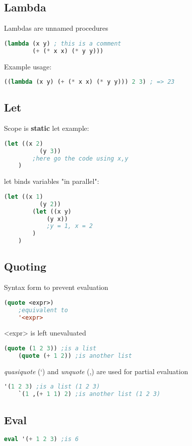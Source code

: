 

\subsection{Lambda}
Lambdas are unnamed procedures
\begin{lstlisting}[language=Lisp]
    (lambda (x y) ; this is a comment
        (+ (* x x) (* y y)))
\end{lstlisting}
Example usage:
\begin{lstlisting}[language=Lisp]
    ((lambda (x y) (+ (* x x) (* y y))) 2 3) ; => 23
\end{lstlisting}

\subsection{Let}
Scope is \textbf{static}
let example:
\begin{lstlisting}[language=Lisp]
    (let ((x 2)
          (y 3))
        ;here go the code using x,y
    )
\end{lstlisting}
let binds variables "in parallel":
\begin{lstlisting}[language=Lisp]
    (let ((x 1)
          (y 2))
        (let ((x y)
            (y x))
            ;y = 1, x = 2 
        )   
    )
\end{lstlisting}

\subsection{Quoting}
Syntax form to prevent evaluation
\begin{lstlisting}[language=Lisp]
    (quote <expr>)
    ;equivalent to
    '<expr>
\end{lstlisting}
<expr> is left unevaluated
\begin{lstlisting}[language=Lisp]
    (quote (1 2 3)) ;is a list
    (quote (+ 1 2)) ;is another list
\end{lstlisting}
\textit{quasiquote} (‘) and \textit{unquote} (,) are used for partial evaluation
\begin{lstlisting}[language=Lisp]
    '(1 2 3) ;is a list (1 2 3)
    `(1 ,(+ 1 1) 2) ;is another list (1 2 3)
\end{lstlisting}

\subsection{Eval}
\begin{lstlisting}[language=Lisp]
    eval '(+ 1 2 3) ;is 6
\end{lstlisting}

